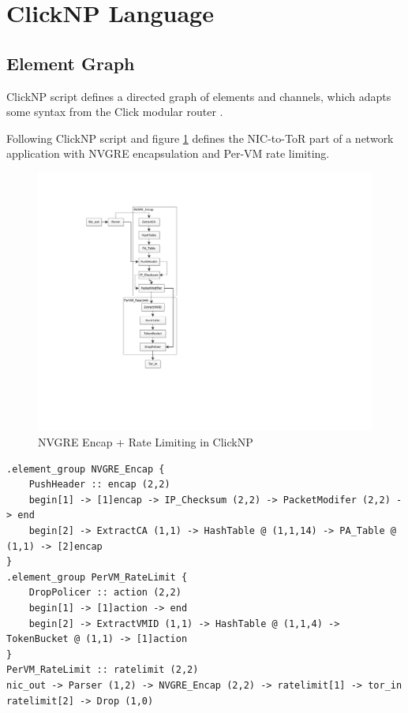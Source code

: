 \section{ClickNP Language}
\label{clicknp:sec:language}

\subsection{Element Graph}

ClickNP script defines a directed graph of elements and channels, which adapts some syntax from the Click modular router \cite{kohler2000click}.

Following ClickNP script and figure \ref{clicknp:fig:ClickNPScriptExample} defines the NIC-to-ToR part of a network application with NVGRE encapsulation and Per-VM rate limiting.

\begin{figure}[!t]
	\centering
	\includegraphics[width=1.0\columnwidth]{image/ApplicationExample}
	\vspace{-0.25in}
	\caption{NVGRE Encap + Rate Limiting in ClickNP}
	\vspace{-0.15in}
	\label{clicknp:fig:ClickNPScriptExample}
\end{figure}

\begin{lstlisting}
.element_group NVGRE_Encap {
    PushHeader :: encap (2,2)
    begin[1] -> [1]encap -> IP_Checksum (2,2) -> PacketModifer (2,2) -> end
    begin[2] -> ExtractCA (1,1) -> HashTable @ (1,1,14) -> PA_Table @ (1,1) -> [2]encap
}
.element_group PerVM_RateLimit {
    DropPolicer :: action (2,2)
    begin[1] -> [1]action -> end
    begin[2] -> ExtractVMID (1,1) -> HashTable @ (1,1,4) -> TokenBucket @ (1,1) -> [1]action
}
PerVM_RateLimit :: ratelimit (2,2)
nic_out -> Parser (1,2) -> NVGRE_Encap (2,2) -> ratelimit[1] -> tor_in
ratelimit[2] -> Drop (1,0)
\end{lstlisting}


